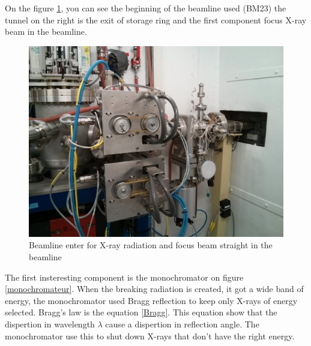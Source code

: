 \documentclass[11pt,a4paper,oneside]{report}
\begin{document}
On the figure \ref{Incident}, you can see the beginning of the beamline used (BM23) the tunnel on the right is the exit of storage ring and the first component focus X-ray beam in the beamline.


\begin{figure}[H]
    \begin{center}
        \includegraphics[scale=0.13]{Images/IMG_20151210_202655.jpg}
        \caption{Beamline enter for X-ray radiation and focus beam straight in the beamline}
        \label{Incident}
    \end{center}
\end{figure}
\medskip

The first insteresting component is the monochromator on figure \ref{monochromateur}. When the breaking radiation is created, it got a wide band of energy, the monochromator used Bragg reflection to keep only X-rays of energy selected. Bragg's law is the equation \ref{Bragg}. This equation show that the dispertion in wavelength $\lambda$ cause a dispertion in reflection angle. The monochromator use this to shut down X-rays that don't have the right energy.
\end{document}
